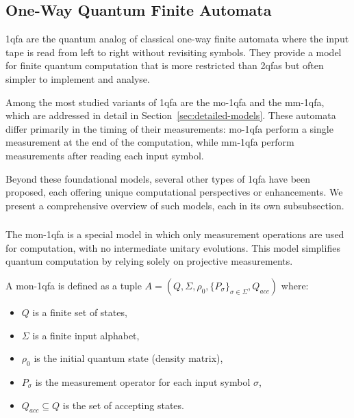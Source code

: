 \subsection{One-Way Quantum Finite Automata}
\label{sec:1-way-qfa}

\gls{1qfa} are the quantum analog of classical one-way finite automata where the input tape is read from left to right without revisiting symbols. They provide a model for finite quantum computation that is more restricted than \glspl{2qfa} but often simpler to implement and analyse.

Among the most studied variants of \gls{1qfa} are the \gls{mo-1qfa} and the \gls{mm-1qfa}, which are addressed in detail in Section~\ref{sec:detailed-models}. These automata differ primarily in the timing of their measurements: \gls{mo-1qfa} perform a single measurement at the end of the computation, while \gls{mm-1qfa} perform measurements after reading each input symbol.

Beyond these foundational models, several other types of \gls{1qfa} have been proposed, each offering unique computational perspectives or enhancements. We present a comprehensive overview of such models, each in its own subsubsection.

\subsubsection{}
The \gls{mon-1qfa} is a special model in which only measurement operations are used for computation, with no intermediate unitary evolutions. This model simplifies quantum computation by relying solely on projective measurements.

\begin{definition}
A \gls{mon-1qfa} is defined as a tuple \( A = (Q, \Sigma, \rho_0, \{P_{\sigma}\}_{\sigma \in \Sigma}, Q_{acc}) \) where:
\begin{itemize}
    \item \( Q \) is a finite set of states,
    \item \( \Sigma \) is a finite input alphabet,
    \item \( \rho_0 \) is the initial quantum state (density matrix),
    \item \( P_{\sigma} \) is the measurement operator for each input symbol \( \sigma \),
    \item \( Q_{acc} \subseteq Q \) is the set of accepting states.
\end{itemize}
\end{definition}

